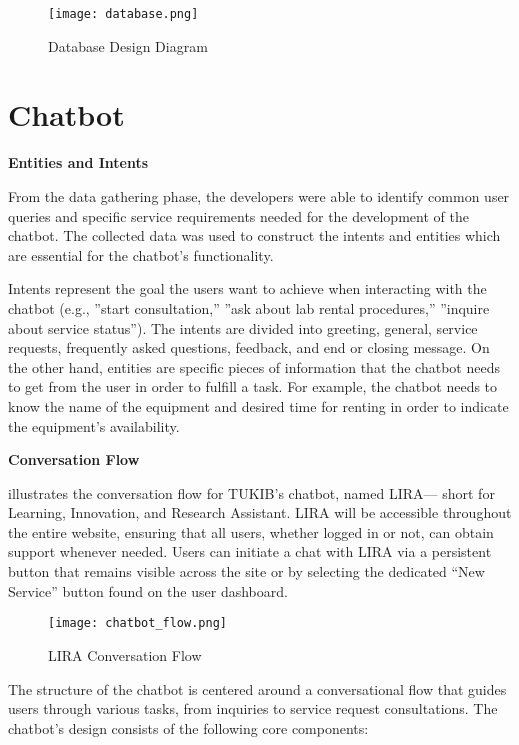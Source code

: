 \begin{figure}[h]
	\centering 
	\texttt{[image: database.png]}
	\caption{Database Design Diagram}
	\label{fig:database}
\end{figure}

\newpage

\section{Chatbot}

\textbf{Entities and Intents}

From the data gathering phase, the developers were able to identify common user queries and specific service requirements needed for the development of the chatbot. The collected data was used to construct the intents and entities which are essential for the chatbot’s functionality. 

Intents represent the goal the users want to achieve when interacting with the chatbot (e.g., ”start consultation,” ”ask about lab rental procedures,” ”inquire about service status”). The intents are divided into greeting, general, service requests, frequently asked questions, feedback, and end or closing message. On the other hand, entities are specific pieces of information that the chatbot needs to get from the user in order to fulfill a task. For example, the chatbot needs to know the name of the equipment and desired time for renting in order to indicate the equipment's availability. 

\newpage

\noindent \textbf{Conversation Flow}

 illustrates the conversation flow for TUKIB's chatbot, named LIRA— short for Learning, Innovation, and Research Assistant. LIRA will be accessible throughout the entire website, ensuring that all users, whether logged in or not, can obtain support whenever needed. Users can initiate a chat with LIRA via a persistent button that remains visible across the site or by selecting the dedicated “New Service” button found on the user dashboard.

\begin{figure}[h]
	\centering 
	\texttt{[image: chatbot\_flow.png]}
	\caption{LIRA Conversation Flow}
	\label{fig:chatbot_flow}
\end{figure}

The structure of the chatbot is centered around a conversational flow that guides users through various tasks, from inquiries to service request consultations. The chatbot’s design consists of the following core components:

